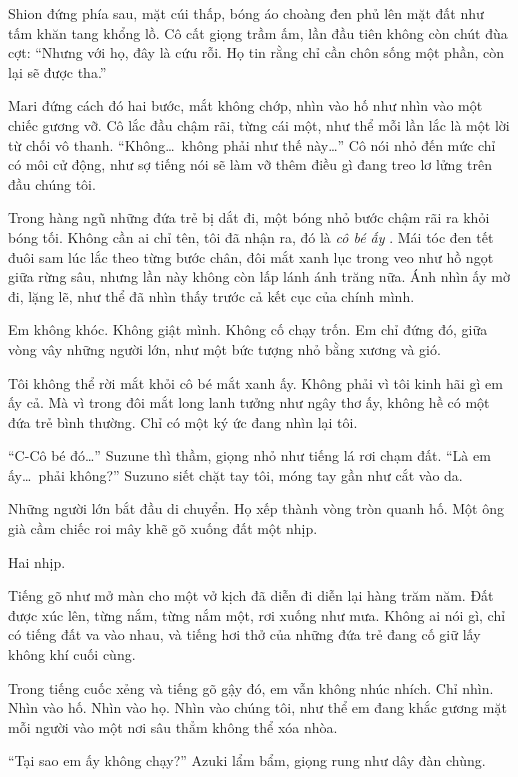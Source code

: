 \documentclass[../main.tex]{subfiles}
\begin{document}
Shion đứng phía sau, mặt cúi thấp, bóng áo choàng đen phủ lên mặt đất như tấm khăn tang khổng lồ. Cô cất giọng trầm ấm, lần đầu tiên không còn chút đùa cợt: ``Nhưng với họ, đây là cứu rỗi. Họ tin rằng chỉ cần chôn sống một phần, còn lại sẽ được tha.''

Mari đứng cách đó hai bước, mắt không chớp, nhìn vào hố như nhìn vào một chiếc gương vỡ. Cô lắc đầu chậm rãi, từng cái một, như thể mỗi lần lắc là một lời từ chối vô thanh. ``Không\dots\ không phải như thế này\dots'' Cô nói nhỏ đến mức chỉ có môi cử động, như sợ tiếng nói sẽ làm vỡ thêm điều gì đang treo lơ lửng trên đầu chúng tôi.

Trong hàng ngũ những đứa trẻ bị dắt đi, một bóng nhỏ bước chậm rãi ra khỏi bóng tối. Không cần ai chỉ tên, tôi đã nhận ra, đó là \emph{cô bé ấy }. Mái tóc đen tết đuôi sam lúc lắc theo từng bước chân, đôi mắt xanh lục trong veo như hồ ngọt giữa rừng sâu, nhưng lần này không còn lấp lánh ánh trăng nữa. Ánh nhìn ấy mờ đi, lặng lẽ, như thể đã nhìn thấy trước cả kết cục của chính mình.

Em không khóc. Không giật mình. Không cố chạy trốn. Em chỉ đứng đó, giữa vòng vây những người lớn, như một bức tượng nhỏ bằng xương và gió.

Tôi không thể rời mắt khỏi cô bé mắt xanh ấy. Không phải vì tôi kinh hãi gì em ấy cả. Mà vì trong đôi mắt long lanh tưởng như ngây thơ ấy, không hề có một đứa trẻ bình thường. Chỉ có một ký ức đang nhìn lại tôi.

``C-Cô bé đó\dots'' Suzune thì thầm, giọng nhỏ như tiếng lá rơi chạm đất. ``Là em ấy\dots\ phải không?'' Suzuno siết chặt tay tôi, móng tay gần như cắt vào da.

Những người lớn bắt đầu di chuyển. Họ xếp thành vòng tròn quanh hố. Một ông già cầm chiếc roi mây khẽ gõ xuống đất một nhịp.

Hai nhịp.

Tiếng gõ như mở màn cho một vở kịch đã diễn đi diễn lại hàng trăm năm. Đất được xúc lên, từng nắm, từng nắm một, rơi xuống như mưa. Không ai nói gì, chỉ có tiếng đất va vào nhau, và tiếng hơi thở của những đứa trẻ đang cố giữ lấy không khí cuối cùng.

Trong tiếng cuốc xẻng và tiếng gõ gậy đó, em vẫn không nhúc nhích. Chỉ nhìn. Nhìn vào hố. Nhìn vào họ.  Nhìn vào chúng tôi, như thể em đang khắc gương mặt mỗi người vào một nơi sâu thẳm không thể xóa nhòa.

``Tại sao em ấy không chạy?'' Azuki lẩm bẩm, giọng rung như dây đàn chùng.
\end{document}
